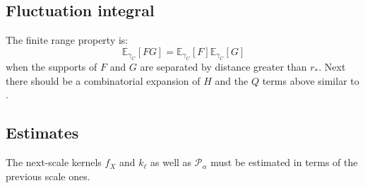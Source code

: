 \documentclass[11pt]{article}
\newcommand{\E}{\mathbb E}
\numberwithin{equation}{section}
\theoremstyle{definition}
\theoremstyle{plain}
\begin{document}
\subsection{Fluctuation integral}

The finite range property is:
\begin{equation}
\E_{\gamma_C}[FG] = \E_{\gamma_C}[F]\E_{\gamma_C}[G]
\end{equation}
when the supports of $F$ and $G$ are separated by distance greater than $r_*$.
Next there should be a combinatorial expansion of $H$ and the $Q$ terms above
similar to \cite{MR2523458}.

\subsection{Estimates}

The next-scale kernels $f_X$ and $k_\ell$ as well as $\mathcal P_\alpha$
must be estimated in terms of the previous scale ones.


\newpage


\end{document}
